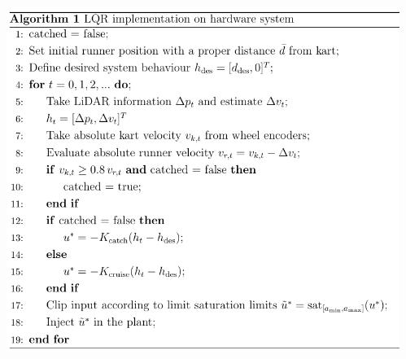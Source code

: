 \documentclass[9pt, aspectratio=169]{beamer}
\begin{document}
\begin{frame}
\begin{columns}
\begin{column}{0.40\textwidth}
\end{column}
\hspace{0.4cm}
\begin{column}{0.50\textwidth}
	\begin{center}
  		\includegraphics[width=1\textwidth]{LQR_alg} 
	\end{center}
\end{column}
\end{columns}

\end{frame}
\end{document}
